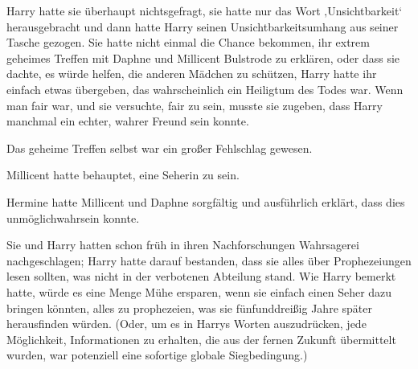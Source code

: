 Harry hatte sie überhaupt nichtsgefragt, sie hatte nur das Wort ‚Unsichtbarkeit‘ herausgebracht und dann hatte Harry seinen Unsichtbarkeitsumhang aus seiner Tasche gezogen. Sie hatte nicht einmal die Chance bekommen, ihr extrem geheimes Treffen mit Daphne und Millicent Bulstrode zu erklären, oder dass sie dachte, es würde helfen, die anderen Mädchen zu schützen, Harry hatte ihr einfach etwas übergeben, das wahrscheinlich ein Heiligtum des Todes war. Wenn man fair war, und sie versuchte, fair zu sein, musste sie zugeben, dass Harry manchmal ein echter, wahrer Freund sein konnte.

Das geheime Treffen selbst war ein großer Fehlschlag gewesen.

Millicent hatte behauptet, eine Seherin zu sein.

Hermine hatte Millicent und Daphne sorgfältig und ausführlich erklärt, dass dies unmöglichwahrsein konnte.

Sie und Harry hatten schon früh in ihren Nachforschungen Wahrsagerei nachgeschlagen; Harry hatte darauf bestanden, dass sie alles über Prophezeiungen lesen sollten, was nicht in der verbotenen Abteilung stand. Wie Harry bemerkt hatte, würde es eine Menge Mühe ersparen, wenn sie einfach einen Seher dazu bringen könnten, alles zu prophezeien, was sie fünfunddreißig Jahre später herausfinden würden. (Oder, um es in Harrys Worten auszudrücken, jede Möglichkeit, Informationen zu erhalten, die aus der fernen Zukunft übermittelt wurden, war potenziell eine sofortige globale Siegbedingung.)

